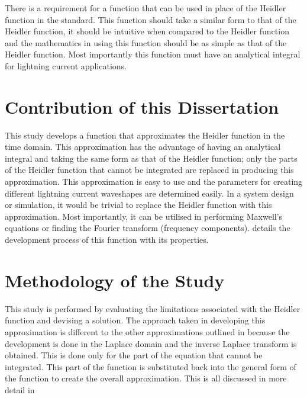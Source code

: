 There is a requirement for a function that can be used in place of the Heidler function in the standard. This function should take a similar form to that of the Heidler function, it should be intuitive when compared to the Heidler function and the mathematics in using this function should be as simple as that of the Heidler function. Most importantly this function must have an analytical integral for lightning current applications.


\section{Contribution of this Dissertation}
\label{sec:approach_contribution_of_this_dissertation}
This study develops a function that approximates the Heidler function in the time domain. This approximation has the advantage of having an analytical integral and taking the same form as that of the Heidler function; only the parts of the Heidler function that cannot be integrated are replaced in producing this approximation. This approximation is easy to use and the parameters for creating different lightning current waveshapes are determined easily. In a system design or simulation, it would be trivial to replace the Heidler function with this approximation. Most importantly, it can be utilised in performing Maxwell's equations or finding the Fourier transform (frequency components).  details the development process of this function with its properties.


\section{Methodology of the Study}
\label{sec:approach_study_methodology}
This study is performed by evaluating the limitations associated with the Heidler function and devising a solution. The approach taken in developing this approximation is different to the other approximations outlined in  because the development is done in the Laplace domain and the inverse Laplace transform is obtained. This is done only for the part of the equation that cannot be integrated. This part of the function is substituted back into the general form of the function to create the overall approximation. This is all discussed in more detail in 


